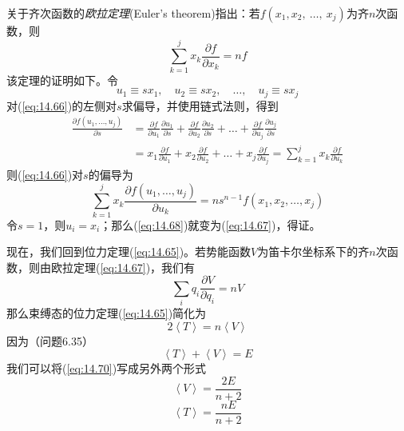     关于齐次函数的\textit{欧拉定理}(Euler's theorem)指出：若$f\left(x_1, x_2, \:\ldots,\: x_j\right)$为齐$n$次函数，则
    \begin{equation}
        \sum_{k=1}^j x_k \frac{\partial f}{\partial x_k} = n f
        \label{eq:14.67}
    \end{equation}
    该定理的证明如下。令
    \begin{equation*}
        u_1 \equiv sx_1, \quad u_2 \equiv sx_2, \quad \ldots, \quad u_j \equiv sx_j
    \end{equation*}
    对(\ref{eq:14.66})的左侧对$s$求偏导，并使用链式法则，得到
    \begin{equation*}
        \begin{aligned}
            \frac{\partial f \left(u_1,\ldots,u_j\right)}{\partial s} &= \frac{\partial f}{\partial u_1} \frac{\partial u_1}{\partial s} + \frac{\partial f}{\partial u_2} \frac{\partial u_2}{\partial s} + \ldots + \frac{\partial f}{\partial u_j} \frac{\partial u_j}{\partial s} \\
            &= x_1 \frac{\partial f}{\partial u_1} + x_2 \frac{\partial f}{\partial u_2} + \ldots + x_j \frac{\partial f}{\partial u_j} = \sum_{k=1}^j x_k \frac{\partial f}{\partial u_k}
        \end{aligned}
    \end{equation*}
    则(\ref{eq:14.66})对$s$的偏导为
    \begin{equation}
        \sum_{k=1}^{j} x_k \frac{\partial f \left(u_1,\ldots,u_j\right)}{\partial u_k} = ns^{n-1} f\left(x_1, x_2, \ldots, x_j\right)
        \label{eq:14.68}
    \end{equation}
    令$s=1$，则$u_i = x_i$；那么(\ref{eq:14.68})就变为(\ref{eq:14.67})，得证。

    现在，我们回到位力定理(\ref{eq:14.65})。若势能函数$V$为笛卡尔坐标系下的齐$n$次函数，则由欧拉定理(\ref{eq:14.67})，我们有
    \begin{equation}
        \sum_i q_i \frac{\partial V}{\partial q_i} = nV
        \label{eq:14.69}
    \end{equation}
    那么束缚态的位力定理(\ref{eq:14.65})简化为
    \begin{equation}
        \boxed{
            2 \left\langle T \right\rangle = n \left\langle V \right\rangle
        }
        \label{eq:14.70}
    \end{equation}
    因为（问题6.35）
    \begin{equation}
        \left\langle T \right\rangle + \left\langle V \right\rangle = E
        \label{eq:14.71}
    \end{equation}
    我们可以将(\ref{eq:14.70})写成另外两个形式
    \begin{equation}
        \left\langle V \right\rangle = \frac{2E}{n+2}
        \label{eq:14.72}
    \end{equation}
    \begin{equation}
        \left\langle T \right\rangle = \frac{nE}{n+2}
        \label{eq:14.73}
    \end{equation}

